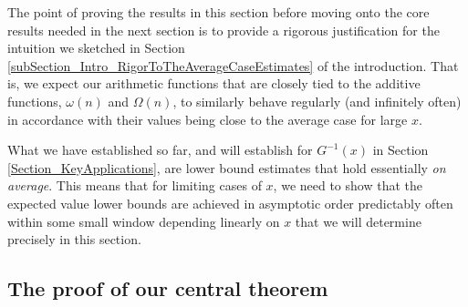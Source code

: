 \documentclass[11pt,reqno,a4letter]{article}
\numberwithin{figure}{section}
\numberwithin{table}{section}
\theoremstyle{plain}
\numberwithin{theorem}{section}
\theoremstyle{definition}
\begin{document}
The point of proving the results in this section before moving onto the core results needed in 
the next section is to provide a rigorous justification for the intuition we sketched in 
Section \ref{subSection_Intro_RigorToTheAverageCaseEstimates} of the introduction. 
That is, we expect our arithmetic functions that are closely 
tied to the additive functions, $\omega(n)$ and $\Omega(n)$, to similarly behave regularly (and 
infinitely often) in accordance with their values being close to the average case for large $x$. 

What we have established so far, and will establish for $G^{-1}(x)$ in 
Section \ref{Section_KeyApplications}, are lower bound estimates that hold essentially 
\emph{on average}. 
This means that for limiting cases of $x$, we need to show that the expected value lower bounds 
are achieved in asymptotic order predictably often 
within some small window depending linearly on $x$ that we will determine precisely in this section. 

\subsection{The proof of our central theorem} 
\end{document}
